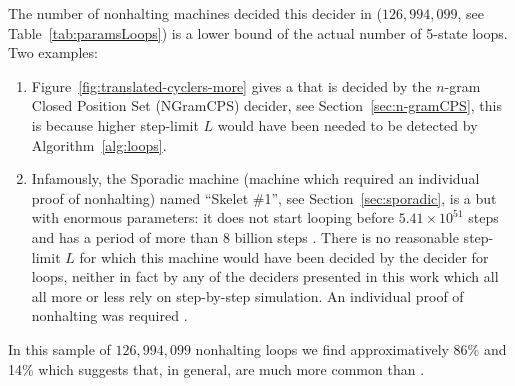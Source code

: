 The number of nonhalting machines decided this decider in \CoqBB (\ie $126{,}994{,}099$, see Table~\ref{tab:paramsLoops}) is a lower bound of the actual number of 5-state loops. Two examples:

\begin{enumerate}
  \item Figure~\ref{fig:translated-cyclers-more} gives a \TC that is decided by the $n$-gram Closed Position Set (NGramCPS) decider, see Section~\ref{sec:n-gramCPS}, this is because higher step-limit $L$ would have been needed to be detected by Algorithm~\ref{alg:loops}.
  \item Infamously, the Sporadic machine (\ie machine which required an individual proof of nonhalting) named ``Skelet \#1'', see Section~\ref{sec:sporadic}, is a \TC but with enormous parameters: it does not start looping before $5.41 \times 10^{51}$ steps and has a period of more than 8 billion steps \cite{ShawnSkelet1}. There is no reasonable step-limit $L$ for which this machine would have been decided by the decider for loops, neither in fact by any of the deciders presented in this work which all all more or less rely on step-by-step simulation. An individual proof of nonhalting was required \cite{busycoq}.
\end{enumerate}

In this sample of $126{,}994{,}099$ nonhalting loops we find approximatively 86\% \TCs and 14\% \cyclers which suggests that, in general, \TCs are much more common than \cyclers.